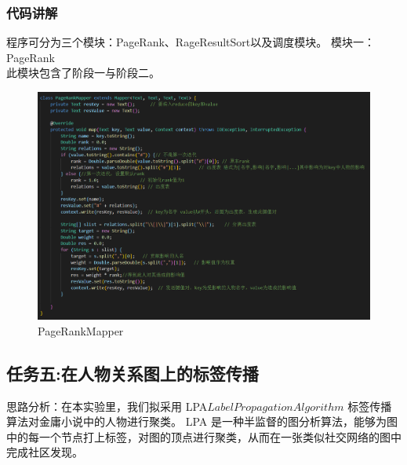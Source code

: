 \documentclass[a4paper,UTF8]{article}
\numberwithin{equation}{section}
\begin{document}
\subsubsection{代码讲解}
程序可分为三个模块：PageRank、RageResultSort以及调度模块。
模块一：PageRank\\
此模块包含了阶段一与阶段二。
\begin{figure}[H]
    \centering

    \includegraphics[width = 15cm]{PageRankMapper.png}

    \caption{PageRankMapper}
\end{figure}
\subsection{任务五:在人物关系图上的标签传播}
思路分析：在本实验里，我们拟采用 LPA\(Label Propagation Algorithm\) 标签传播算法对金庸小说中的人物进行聚类。 LPA 是一种半监督的图分析算法，能够为图中的每一个节点打上标签，对图的顶点进行聚类，从而在一张类似社交网络的图中完成社区发现。
\end{document}
